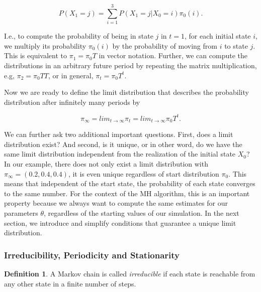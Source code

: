 \documentclass[12pt,english,a4paper,oneside]{article}
\theoremstyle{definition}
\newtheorem{definition}{Definition}[section]
\theoremstyle{definition}
\theoremstyle{definition}
\theoremstyle{definition}
\theoremstyle{remark}
\begin{document}
\begin{equation}
\label{eq:tot-prob}
P(X_1 = j) = \sum_{i=1}^{3} P(X_1 = j | X_0 = i) \pi_0(i).
\end{equation}

\noindent
I.e., to compute the probability of being in state \(j\) in \(t=1\), for each initial state \(i\), we multiply its probability \(\pi_0(i)\) by the probability of moving from \(i\) to state \(j\). This is equivalent to \(\pi_1 = \pi_0 T\) in vector notation. Further, we can compute the distributions in an arbitrary future period by repeating the matrix multiplication, e.g, \(\pi_2 = \pi_0 T T\), or in general, \(\pi_t = \pi_0 T^t\).

Now we are ready to define the limit distribution that describes the probability distribution after infinitely many periods by

\begin{equation}
\label{eq:lim-dist}
\pi_{\infty} = lim_{t \rightarrow \infty} \pi_t = lim_{t \rightarrow \infty} \pi_0 T^t.
\end{equation}

\noindent
We can further ask two additional important questions. First, does a limit distribution exist? And second, is it unique, or in other word, do we have the same limit distribution independent from the realization of the initial state \(X_0\)? In our example, there does not only exist a limit distribution with \(\pi_{\infty} = (0.2, 0.4, 0.4)\), it is even unique regardless of start distribution \(\pi_0\). This means that independent of the start state, the probability of each state converges to the same number. For the context of the MH algorithm, this is an important property because we always want to compute the same estimates for our parameters \(\theta\), regardless of the starting values of our simulation. In the next section, we introduce and simplify conditions that guarantee a unique limit distribution.

\hypertarget{irreducibility-periodicity-and-stationarity}{%
\subsubsection{Irreducibility, Periodicity and Stationarity}\label{irreducibility-periodicity-and-stationarity}}

\begin{definition}
A Markov chain is called \textit{irreducible} if each state is reachable from any other state in a finite number of steps.
\end{definition}
\end{document}
